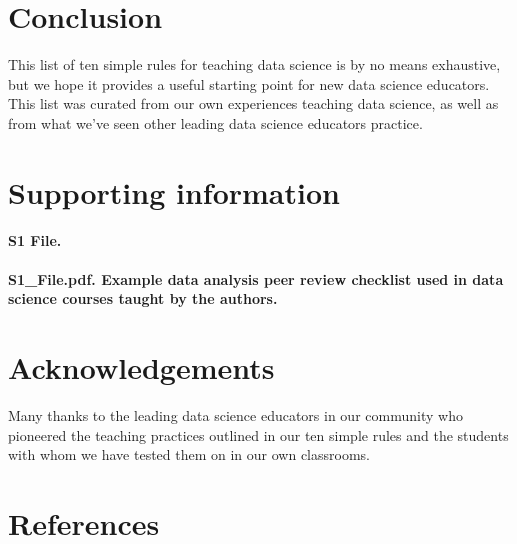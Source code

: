 \documentclass[
  10pt,
  letterpaper,
]{article}
\begin{document}
\section{Conclusion}\label{sec-conclusion}

This list of ten simple rules for teaching data science is by no means
exhaustive, but we hope it provides a useful starting point for new data
science educators. This list was curated from our own experiences
teaching data science, as well as from what we've seen other leading
data science educators practice.

\section{Supporting information}\label{supporting-information}

\paragraph*{S1 File.}
\label{s1-file}
{\textbf{S1\_File.pdf. Example data analysis peer review checklist used
in data science courses taught by the authors.}}

\section{Acknowledgements}\label{acknowledgements}

Many thanks to the leading data science educators in our community who
pioneered the teaching practices outlined in our ten simple rules and
the students with whom we have tested them on in our own classrooms.

\section*{References}\label{references}
\end{document}

